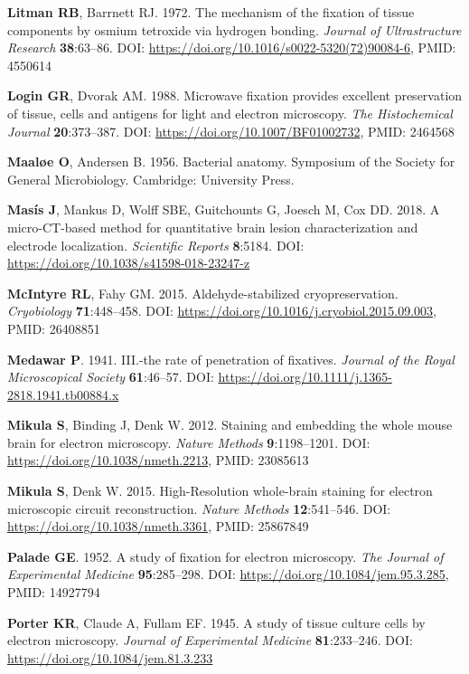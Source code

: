 \documentclass{article}
\newenvironment{reflist}{\par\small\setlength{\parindent}{0pt}\everypar{\hangindent=2.2em\hangafter=1}}{\par}
\begin{document}
\begin{reflist}
\textbf{Litman RB}, Barrnett RJ. 1972. The mechanism of the fixation of tissue components by osmium tetroxide via hydrogen bonding. \emph{Journal of Ultrastructure Research} \textbf{38}:63–86. DOI: \url{https://doi.org/10.1016/s0022-5320(72)90084-6}, PMID: 4550614

\textbf{Login GR}, Dvorak AM. 1988. Microwave fixation provides excellent preservation of tissue, cells and antigens for light and electron microscopy. \emph{The Histochemical Journal} \textbf{20}:373–387. DOI: \url{https://doi.org/10.1007/BF01002732}, PMID: 2464568

\textbf{Maaløe O}, Andersen B. 1956. Bacterial anatomy. Symposium of the Society for General Microbiology. Cambridge: University Press.

\textbf{Masís J}, Mankus D, Wolff SBE, Guitchounts G, Joesch M, Cox DD. 2018. A micro-CT-based method for quantitative brain lesion characterization and electrode localization. \emph{Scientific Reports} \textbf{8}:5184. DOI: \url{https://doi.org/10.1038/s41598-018-23247-z}

\textbf{McIntyre RL}, Fahy GM. 2015. Aldehyde-stabilized cryopreservation. \emph{Cryobiology} \textbf{71}:448–458. DOI: \url{https://doi.org/10.1016/j.cryobiol.2015.09.003}, PMID: 26408851

\textbf{Medawar P}. 1941. III.-the rate of penetration of fixatives. \emph{Journal of the Royal Microscopical Society} \textbf{61}:46–57. DOI: \url{https://doi.org/10.1111/j.1365-2818.1941.tb00884.x}

\textbf{Mikula S}, Binding J, Denk W. 2012. Staining and embedding the whole mouse brain for electron microscopy. \emph{Nature Methods} \textbf{9}:1198–1201. DOI: \url{https://doi.org/10.1038/nmeth.2213}, PMID: 23085613

\textbf{Mikula S}, Denk W. 2015. High-Resolution whole-brain staining for electron microscopic circuit reconstruction. \emph{Nature Methods} \textbf{12}:541–546. DOI: \url{https://doi.org/10.1038/nmeth.3361}, PMID: 25867849

\textbf{Palade GE}. 1952. A study of fixation for electron microscopy. \emph{The Journal of Experimental Medicine} \textbf{95}:285–298. DOI: \url{https://doi.org/10.1084/jem.95.3.285}, PMID: 14927794

\textbf{Porter KR}, Claude A, Fullam EF. 1945. A study of tissue culture cells by electron microscopy. \emph{Journal of Experimental Medicine} \textbf{81}:233–246. DOI: \url{https://doi.org/10.1084/jem.81.3.233}


\end{reflist}
\end{document}
